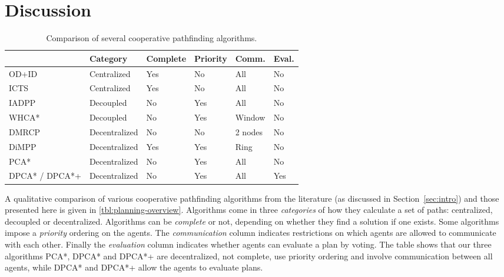 \section{Discussion}\label{sec:discussion}
\begin{table*}[h]
    \centering
    \caption{Comparison of several cooperative pathfinding algorithms.}
    \label{tbl:planning-overview}
    \begin{tabular}{ll|l|l|l|l|l}
        & & Category & Complete & Priority & Comm. & Eval. \\
        \hline
        OD+ID & \cite{standley2010,standley2011} & Centralized & Yes & No &
        All & No \\
        ICTS & \cite{sharon2013} & Centralized & Yes & No & All & No\\
        IADPP & \cite{cap2012} & Decoupled & No & Yes & All & No \\
        WHCA* & \cite{silver2005} & Decoupled & No & Yes & Window & No \\
        DMRCP & \cite{wei2016} & Decentralized & No & No & 2 nodes & No
        \\
        DiMPP & \cite{chouhan2017} & Decentralized & Yes & Yes & Ring & No
        \\ \hline
        PCA* & & Decentralized & No & Yes & All & No \\
        \multicolumn{2}{l|}{DPCA* / DPCA*+} & Decentralized & No & Yes & All & 
        Yes \\
    \end{tabular}
\end{table*}

A qualitative comparison of various cooperative pathfinding algorithms from 
the literature (as discussed in Section~\ref{sec:intro}) and those presented here is given in 
\autoref{tbl:planning-overview}. Algorithms come in three \emph{categories} of how  they 
calculate a set of paths: centralized, decoupled or decentralized. 
Algorithms can be \emph{complete} or not, depending on whether they find a solution if one exists. Some algorithms impose a \emph{priority} ordering on 
the agents. The 
\emph{communication} column indicates restrictions on which agents are allowed 
to communicate with each other. Finally the \emph{evaluation} column indicates 
whether 
agents can evaluate a plan by voting. The table shows that our three algorithms 
PCA*, DPCA* and DPCA*+ are decentralized, not complete, use priority ordering 
and involve communication between all agents, while DPCA* and DPCA*+ allow the 
agents to evaluate plans.


